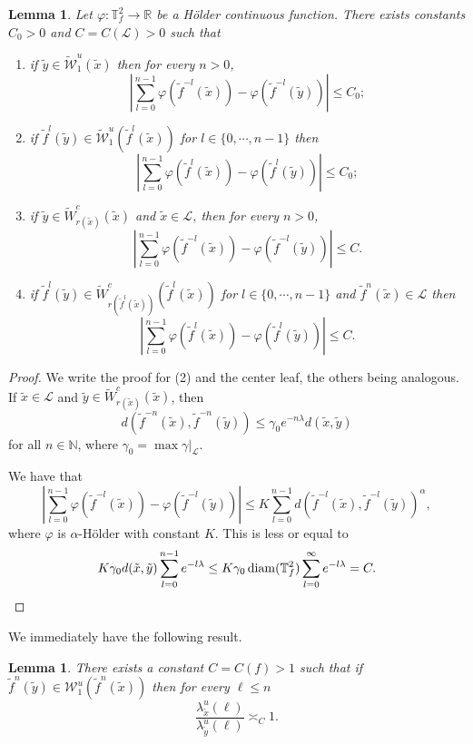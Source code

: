 \documentclass[a4paper,11pt,reqno]{amsart}
\def\tW{\widetilde W}
\newcommand{\R}{{\mathbb R}}
\newcommand{\TTf}{{\mathbb{T}_f^2}}
\newcommand{\cL}{{\mathcal L}}
\newcommand{\cW}{{\mathcal W}}
\newcommand{\tix}{\tilde{x}}
\newcommand{\tif}{\tilde{f}}
\newcommand{\w}{\widetilde{\cW}}
\newtheorem{lemma}[theorem]{Lemma}
\theoremstyle{definition}
\begin{document}
\begin{lemma}
\label{lem:bounded-dist}
Let $\varphi: \TTf \to \R$ be a H\"older continuous function. There exists constants $C_0>0$ and $C=C(\cL)>0$ such that
\begin{enumerate}
	\item  if $\tilde{y} \in \w^u_1(\tix)$ then for every $n>0$, 
	 $$\left\vert \sum_{l=0}^{n-1} \varphi(\tilde{f}^{-l}(\tix)) - \varphi(\tilde{f}^{-l}(\tilde{y}))  \right\vert \leq C_0;$$
	 
	\item if $\tilde{f}^{l}(\tilde{y}) \in \w^u_{1}(\tilde{f}^{l}(\tix))$ for $l \in \{0, \cdots, n-1 \}$ then  $$\left\vert \sum_{l=0}^{n-1} \varphi(\tilde{f}^l(\tix)) - \varphi(\tilde{f}^l(\tilde{y}))  \right\vert \leq C_0;$$
    \item if $\tilde{y} \in \tW^c_{r(\tix)}(\tix)$ and $\tix \in \cL$, then for every $n > 0$,
        $$\left\vert \sum_{l=0}^{n-1} \varphi(\tilde{f}^{-l}(\tix)) - \varphi(\tilde{f}^{-l}(\tilde{y}))  \right\vert \leq C.$$
    \item if $\tilde{f}^{l}(\tilde{y}) \in \tW^c_{r(\tilde{f}^{l}(\tix))}(\tilde{f}^{l}(\tix))$ for $l \in \{0, \cdots, n-1 \}$ and $\tilde{f}^{n}(\tix) \in \cL$ then 
        $$\left\vert \sum_{l=0}^{n-1} \varphi(\tilde{f}^l(\tix)) - \varphi(\tilde{f}^l(\tilde{y}))  \right\vert \leq C.$$
\end{enumerate}
\end{lemma}

\begin{proof}
    We write the proof for (2) and the center leaf, the others being analogous. If $\tix \in \cL$ and $\tilde{y} \in \tW^c_{r(\tix)}(\tix)$, then
$$d(\tilde{f}^{-n}(\tilde{x}), \tilde{f}^{-n}(\tilde{y})) \leq \gamma_0 e^{-n\lambda} d(\tilde{x}, \tilde{y})$$
for all $n \in \mathbb{N}$, where $\gamma_0=\max \gamma|_{\cL}$.

We have that
$$\left\vert \sum_{l=0}^{n-1} \varphi(\tilde{f}^{-l}(\tix)) - \varphi(\tilde{f}^{-l}(\tilde{y}))  \right\vert \leq K \sum_{l=0}^{n-1} d(\tilde{f}^{-l}(\tix), \tilde{f}^{-l}(\tilde{y}))^{\alpha},$$
where $\varphi$ is $\alpha$-H\"older with constant $K$. This is less or equal to
\[
K \gamma_0 d(\tilde{x}, \tilde{y}) \sum_{l=0}^{n-1} e^{-l\lambda} \leq K \gamma_0 \operatorname{diam}(\TTf) \sum_{l=0}^{\infty} e^{-l\lambda} = C.\qedhere
\] 
\end{proof}

We immediately have the following result.

\begin{lemma}
    \label{lem:distor-unstable}
There exists a constant $C=C(f)>1$ such that if $\tif^n(\tilde{y})\in \cW^u_{1}(\tif^n(\tix))$ then for every $\ell\leq n$
\[
\frac{\lambda^u_{\tix}(\ell)}{\lambda^u_{\tilde{y}}(\ell)}\asymp_{C}1.
\]
\end{lemma}
\end{document}
